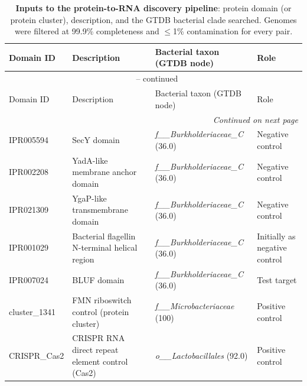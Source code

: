 \begingroup
\footnotesize
\begin{longtable}{p{}p{}p{}p{}}
\caption[Discovery pipeline inputs (protein $\rightarrow$ RNA)]{\textbf{Inputs to the protein-to-RNA discovery pipeline}: protein domain (or protein cluster), description, and the GTDB bacterial clade searched. Genomes were filtered at 99.9\% completeness and $\le$1\% contamination for every pair.}
\label{tab:discovery_inputs} \\
\hline
Domain ID & Description & Bacterial taxon (GTDB node) & Role \\
\hline
\endfirsthead
\multicolumn{4}{c}{\tablename\ \thetable{} -- continued} \\
\hline
Domain ID & Description & Bacterial taxon (GTDB node) & Role \\
\hline
\endhead
\hline
\multicolumn{4}{r}{\emph{Continued on next page}} \\
\endfoot
\hline
\endlastfoot
IPR005594 & SecY domain & \emph{f\_\_Burkholderiaceae\_C} (36.0) & Negative control \\
IPR002208 & YadA-like membrane anchor domain & \emph{f\_\_Burkholderiaceae\_C} (36.0) & Negative control \\
IPR021309 & YgaP-like transmembrane domain & \emph{f\_\_Burkholderiaceae\_C} (36.0) & Negative control \\
IPR001029 & Bacterial flagellin N-terminal helical region & \emph{f\_\_Burkholderiaceae\_C} (36.0) & Initially as negative control \\
IPR007024 & BLUF domain & \emph{f\_\_Burkholderiaceae\_C} (36.0) & Test target \\
cluster\_1341 & FMN riboswitch control (protein cluster) & \emph{f\_\_Microbacteriaceae} (100) & Positive control \\
CRISPR\_Cas2 & CRISPR RNA direct repeat element control (Cas2) & \emph{o\_\_Lactobacillales} (92.0) & Positive control \\
\end{longtable}
\endgroup
